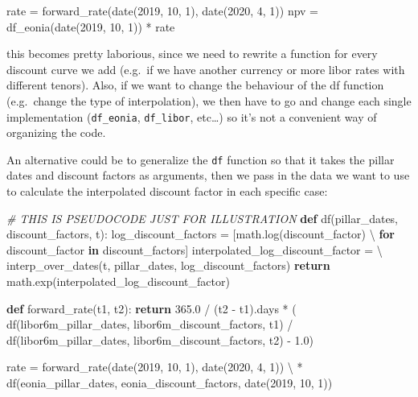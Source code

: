 \documentclass[11pt]{article}
\newenvironment{Shaded}{}{}
\newcommand{\KeywordTok}[1]{\textcolor[rgb]{0.00,0.44,0.13}{\textbf{{#1}}}}
\newcommand{\DecValTok}[1]{\textcolor[rgb]{0.25,0.63,0.44}{{#1}}}
\newcommand{\FloatTok}[1]{\textcolor[rgb]{0.25,0.63,0.44}{{#1}}}
\newcommand{\CommentTok}[1]{\textcolor[rgb]{0.38,0.63,0.69}{\textit{{#1}}}}
\newcommand{\NormalTok}[1]{{#1}}
\newcommand{\ControlFlowTok}[1]{\textcolor[rgb]{0.00,0.44,0.13}{\textbf{{#1}}}}
\newcommand{\OperatorTok}[1]{\textcolor[rgb]{0.40,0.40,0.40}{{#1}}}
\begin{document}
\begin{Shaded}
\begin{Highlighting}[]
\NormalTok{rate }\OperatorTok{=}\NormalTok{ forward_rate(date(}\DecValTok{2019}\NormalTok{, }\DecValTok{10}\NormalTok{, }\DecValTok{1}\NormalTok{), date(}\DecValTok{2020}\NormalTok{, }\DecValTok{4}\NormalTok{, }\DecValTok{1}\NormalTok{))}
\NormalTok{npv }\OperatorTok{=}\NormalTok{ df_eonia(date(}\DecValTok{2019}\NormalTok{, }\DecValTok{10}\NormalTok{, }\DecValTok{1}\NormalTok{)) }\OperatorTok{*}\NormalTok{ rate}
\end{Highlighting}
\end{Shaded}

    this becomes pretty laborious, since we need to rewrite a function for
every discount curve we add (e.g.~if we have another currency or more
libor rates with different tenors). Also, if we want to change the
behaviour of the df function (e.g.~change the type of interpolation), we
then have to go and change each single implementation
(\texttt{df\_eonia}, \texttt{df\_libor}, etc\ldots{}) so it's not a
convenient way of organizing the code.

An alternative could be to generalize the \texttt{df} function so that
it takes the pillar dates and discount factors as arguments, then we
pass in the data we want to use to calculate the interpolated discount
factor in each specific case:

    \begin{Shaded}
\begin{Highlighting}[]
\CommentTok{# THIS IS PSEUDOCODE JUST FOR ILLUSTRATION}
\KeywordTok{def}\NormalTok{ df(pillar_dates, discount_factors, t):}
\NormalTok{    log_discount_factors }\OperatorTok{=}\NormalTok{ [math.log(discount_factor) }\OperatorTok{\textbackslash{}}
        \ControlFlowTok{for}\NormalTok{ discount_factor }\KeywordTok{in}\NormalTok{ discount_factors]}
\NormalTok{    interpolated_log_discount_factor }\OperatorTok{=} \OperatorTok{\textbackslash{}}
\NormalTok{        interp_over_dates(t, pillar_dates, log_discount_factors)}
    \ControlFlowTok{return}\NormalTok{ math.exp(interpolated_log_discount_factor)}

\KeywordTok{def}\NormalTok{ forward_rate(t1, t2):}
    \ControlFlowTok{return} \FloatTok{365.0} \OperatorTok{/}\NormalTok{ (t2 - t1).days }\OperatorTok{*}\NormalTok{ (}
\NormalTok{        df(libor6m_pillar_dates, libor6m_discount_factors, t1) }\OperatorTok{/}
\NormalTok{        df(libor6m_pillar_dates, libor6m_discount_factors, t2) - }\FloatTok{1.0}\NormalTok{)}

\NormalTok{rate }\OperatorTok{=}\NormalTok{ forward_rate(date(}\DecValTok{2019}\NormalTok{, }\DecValTok{10}\NormalTok{, }\DecValTok{1}\NormalTok{), date(}\DecValTok{2020}\NormalTok{, }\DecValTok{4}\NormalTok{, }\DecValTok{1}\NormalTok{)) }\OperatorTok{\textbackslash{}}
    \OperatorTok{*}\NormalTok{ df(eonia_pillar_dates, eonia_discount_factors, date(}\DecValTok{2019}\NormalTok{, }\DecValTok{10}\NormalTok{, }\DecValTok{1}\NormalTok{))}
\end{Highlighting}
\end{Shaded}
\end{document}
